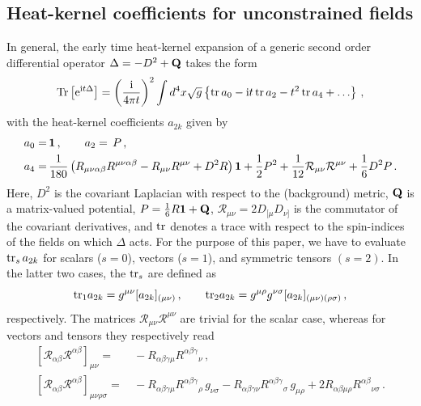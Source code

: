 \documentclass[preprint,preprintnumbers,amsmath,amssymb,nofootinbib,APS]{revtex4}
\newcommand{\be}{\begin{equation}}
\newcommand{\ee}{\end{equation}}
\let\m=\mu    \let\n=\nu    \let\x=\xi      \let\r=\rho \let\om=\omega
\newcommand{\tr}{{\rm tr}}
\newcommand{\Tr}{{\rm Tr}}
\newcommand{\cR}{\mathcal{R}}
\newcommand{\unit}{{\bf{1}}}
\newcommand{\2}{\sqrt{2\,}}
\newcommand{\I}{\mathrm{i}}
\newcommand{\e}{\mathrm{e}}
\newcommand{\bQ}{{\bf{Q}}}
\begin{document}
\begin{appendix}
\subsection{Heat-kernel coefficients for unconstrained fields}
\label{App:B1}
In general, the early time heat-kernel expansion of a generic second
order differential operator $\Delta = -D^2 +\bQ$ takes the form
%
\be\label{Hexp}
\Tr\left[ \e^{\I t \Delta} \right] = \left( \frac{\I}{4 \pi t} \right)^{2} \int d^4x \sqrt{g}
\left\{ \tr \, a_0 - \I t \, \tr \, a_2 - t^2 \, \tr \, a_4 + \ldots \right\} \, ,
\ee
%
with the heat-kernel coefficients $a_{2k}$ given by \cite{Gilkey:1995mj}
%
\be
\begin{split}
a_0 = & \, \unit \, , \qquad 
a_2 = \, P \, , \\
a_4 = & \, \frac{1}{180} \left( R_{\m\n\alpha\beta} R^{\m\n\alpha\beta} - R_{\m\n}R^{\m\n} + D^2 R\right) \unit + \frac{1}{2} P^2 + \frac{1}{12} \cR_{\m\n} \cR^{\m\n} + \frac{1}{6} D^2 P \, .
\end{split}
\ee
%
Here, $D^2$ is the covariant Laplacian with respect to the (background) metric, $\bQ$ is a matrix-valued potential, $P = \tfrac{1}{6} R {\bf \unit} + \bQ$, $\cR_{\mu\nu} = 2 D_{[\mu} D_{\nu]}$ is the commutator of the covariant derivatives, and $\tr$ denotes a trace with respect to the spin-indices of the fields on which $\Delta$ acts. For the purpose of 
this paper, we have to evaluate $\tr_s \, a_{2k}$ for scalars ($s=0$), vectors ($s=1$), and symmetric tensors $(s=2)$. In the latter two cases, the $\tr_s$ are defined as 
%
\be
\tr_{1} a_{2k} = g^{\m\n} [a_{2k}]_{(\m\n)} \, , \qquad \tr_{2} a_{2k} = g^{\mu \rho} g^{\n \sigma} [a_{2k}]_{(\m\n)(\rho\sigma)} \, ,
\ee
%
respectively. The matrices $\cR_{\mu\nu} \cR^{\mu\nu}$ are trivial for the scalar case, whereas for vectors and tensors they respectively read
%
\be
\begin{split}
\left[ \cR_{\alpha\beta} \cR^{\alpha\beta} \right]_{\m\n} = & \, - R_{\alpha \beta\gamma \mu} R^{\alpha \beta\gamma}{}_{\nu} \, , \quad \\
%
\left[ \cR_{\alpha\beta} \cR^{\alpha\beta} \right]_{\m\n\rho\sigma} = & \,
- R_{\alpha \beta\gamma \mu} R^{\alpha \beta\gamma}{}_{\rho} \, g_{\nu \sigma}
- R_{\alpha \beta\gamma \nu} R^{\alpha \beta\gamma}{}_{\sigma} \, g_{\mu \rho}
+ 2 R_{\alpha \beta\mu\rho} R^{\alpha \beta}{}_{\nu\sigma} \, .
\end{split}
\ee
%



\end{appendix}
\end{document}
